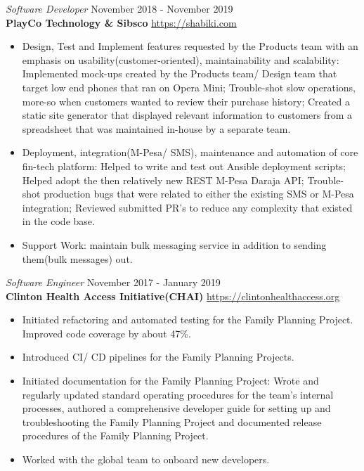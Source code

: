 \documentclass[margin, line]{res} %
\begin{document}

{\sl Software Developer} \hfill November 2018 - November 2019 \\
\textbf{PlayCo Technology \& Sibsco } \hfill \url{https://shabiki.com}
\begin{itemize} \itemsep -2pt
\item Design, Test and Implement features requested by the Products
  team with an emphasis on usability(customer-oriented),
  maintainability and scalability: Implemented mock-ups created by the
  Products team/ Design team that target low end phones that ran on
  Opera Mini; Trouble-shot slow operations, more-so when customers
  wanted to review their purchase history; Created a static site
  generator that displayed relevant information to customers from a
  spreadsheet that was maintained in-house by a separate team.
\item Deployment, integration(M-Pesa/ SMS), maintenance and automation
  of core fin-tech platform: Helped to write and test out Ansible
  deployment scripts; Helped adopt the then relatively new REST M-Pesa
  Daraja API; Trouble-shot production bugs that were related to either
  the existing SMS or M-Pesa integration; Reviewed submitted PR’s to
  reduce any complexity that existed in the code base.
\item Support Work: maintain bulk messaging service in addition to
  sending them(bulk messages) out.
\end{itemize}


    {\sl Software Engineer} \hfill November 2017 - January 2019 \\
    \textbf{Clinton Health Access Initiative(CHAI)} \hfill \url{https://clintonhealthaccess.org}
    \begin{itemize} \itemsep -2pt %
    \item Initiated refactoring and automated testing for the Family
      Planning Project. Improved code coverage by about 47\%.
    \item Introduced CI/ CD pipelines for the Family Planning Projects.
    \item Initiated documentation for the Family Planning Project:
      Wrote and regularly updated standard operating procedures for
      the team's internal processes, authored a comprehensive
      developer guide for setting up and troubleshooting the Family
      Planning Project and documented release procedures of the Family
      Planning Project.
    \item Worked with the global team to onboard new developers.
    \end{itemize}
\end{document}
